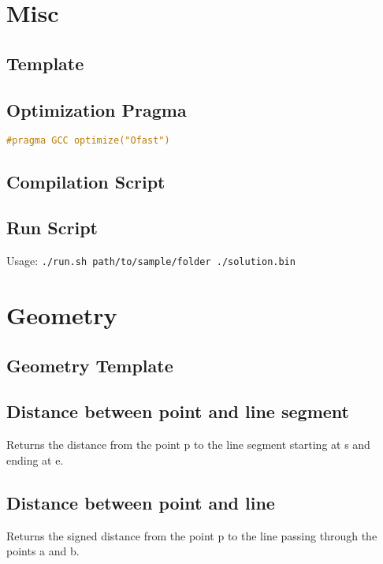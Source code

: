 \documentclass{article}
\begin{document}
\section*{Misc}

\subsection*{Template}


\subsection*{Optimization Pragma}
\begin{lstlisting}[language=C++]
#pragma GCC optimize("Ofast")
\end{lstlisting}

\subsection*{Compilation Script}


\subsection*{Run Script}
Usage: \lstinline{./run.sh path/to/sample/folder ./solution.bin}


\section*{Geometry}

\subsection*{Geometry Template}


\subsection*{Distance between point and line segment}
Returns the distance from the point p to the line segment starting at s and ending at e.


\subsection*{Distance between point and line}
Returns the signed distance from the point p to the line passing through the points a and b.

\end{document}
